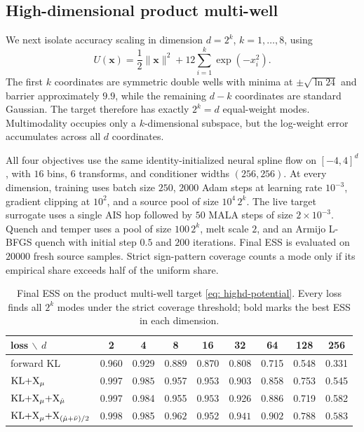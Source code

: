 \documentclass{article}
\begin{document}
\subsection{High-dimensional product multi-well}
\label{subsec: highd}

We next isolate accuracy scaling in dimension $d=2^k$, $k=1,\ldots,8$, using
\begin{equation}
    U(\mathbf{x})=\frac12\lVert\mathbf{x}\rVert^2
    +12\sum_{i=1}^{k}\exp(-x_i^2).
    \label{eq: highd-potential}
\end{equation}
The first $k$ coordinates are symmetric double wells with minima at $\pm\sqrt{\ln 24}$ and barrier approximately $9.9$, while the remaining $d-k$ coordinates are standard Gaussian. The target therefore has exactly $2^k=d$ equal-weight modes. Multimodality occupies only a $k$-dimensional subspace, but the log-weight error accumulates across all $d$ coordinates.

All four objectives use the same identity-initialized neural spline flow on $[-4,4]^d$, with $16$ bins, $6$ transforms, and conditioner widths $(256,256)$. At every dimension, training uses batch size $250$, $2000$ Adam steps at learning rate $10^{-3}$, gradient clipping at $10^2$, and a source pool of size $10^4\,2^k$. The live target surrogate uses a single AIS hop followed by $50$ MALA steps of size $2\times10^{-3}$. Quench and temper uses a pool of size $100\,2^k$, melt scale $2$, and an Armijo L-BFGS quench with initial step $0.5$ and $200$ iterations. Final ESS is evaluated on $20000$ fresh source samples. Strict sign-pattern coverage counts a mode only if its empirical share exceeds half of the uniform share.

\begin{table}[htb]
    \centering
    \begin{tabular}{@{}lcccccccc@{}}
        \toprule
        loss $\backslash$ $d$ & 2 & 4 & 8 & 16 & 32 & 64 & 128 & 256 \\
        \midrule
        forward KL & 0.960 & 0.929 & 0.889 & 0.870 & 0.808 & 0.715 & 0.548 & 0.331 \\
        $\mathrm{KL}{+}\mathrm{X}_\mu$ & 0.997 & $\mathbf{0.985}$ & 0.957 & 0.953 & 0.903 & 0.858 & 0.753 & 0.545 \\
        $\mathrm{KL}{+}\mathrm{X}_\mu{+}\mathrm{X}_{\hat\mu}$ & 0.997 & 0.984 & 0.955 & $\mathbf{0.953}$ & 0.926 & 0.886 & 0.719 & 0.582 \\
        $\mathrm{KL}{+}\mathrm{X}_\mu{+}\mathrm{X}_{(\hat\mu+\bar\nu)/2}$ & $\mathbf{0.998}$ & 0.985 & $\mathbf{0.962}$ & 0.952 & $\mathbf{0.941}$ & $\mathbf{0.902}$ & $\mathbf{0.788}$ & $\mathbf{0.583}$ \\
        \bottomrule
    \end{tabular}
    \caption{Final ESS on the product multi-well target \eqref{eq: highd-potential}. Every loss finds all $2^k$ modes under the strict coverage threshold; bold marks the best ESS in each dimension.}
    \label{tab: highd-ess}
\end{table}
\end{document}
